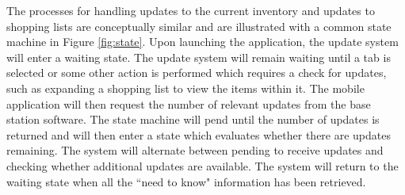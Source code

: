 \documentclass[11pt]{article} %
\begin{document}
 The processes for handling updates to the current inventory and updates to shopping lists are conceptually similar and are illustrated with a common state machine in Figure \ref{fig:state}. Upon launching the application, the update system will enter a waiting state. The update system will remain waiting until a tab is selected or some other action is performed which requires a check for updates, such as expanding a shopping list to view the items within it. The mobile application will  then request the number of relevant updates from the base station software. The state machine will pend until the number of updates is returned and will then enter a state which evaluates whether there are updates remaining. The system will alternate between pending to receive updates and checking whether additional updates are available. The system will return to the waiting state when all the ``need to know" information has been retrieved.
\end{document}
